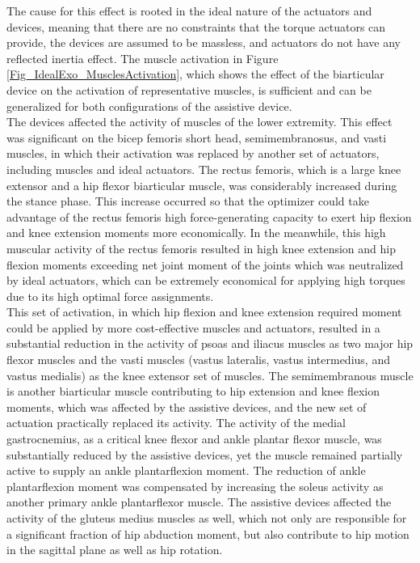 \documentclass[10pt,letterpaper]{article}
\begin{document}
The cause for this effect is rooted in the ideal nature of the actuators and devices, meaning that there are no constraints that the torque actuators can provide, the devices are assumed to be massless, and actuators do not have any reflected inertia effect. The muscle activation in Figure \ref{Fig_IdealExo_MusclesActivation}, which shows the effect of the biarticular device on the activation of representative muscles, is sufficient and can be generalized for both configurations of the assistive device. \\
The devices affected the activity of muscles of the lower extremity. This effect was significant on the bicep femoris short head, semimembranosus, and vasti muscles, in which their activation was replaced by another set of actuators, including muscles and ideal actuators.  The rectus femoris, which is a large knee extensor and a hip flexor biarticular muscle, was considerably increased during the stance phase. This increase occurred so that the optimizer could take advantage of the rectus femoris high force-generating capacity to exert hip flexion and knee extension moments more economically. In the meanwhile, this high muscular activity of the rectus femoris resulted in high knee extension and hip flexion moments exceeding net joint moment of the joints which was neutralized by ideal actuators, which can be extremely economical for applying high torques due to its high optimal force assignments.\\
This set of activation, in which hip flexion and knee extension required moment could be applied by more cost-effective muscles and actuators, resulted in a substantial reduction in the activity of psoas and iliacus muscles as two major hip flexor muscles and the vasti muscles (vastus lateralis, vastus intermedius, and vastus medialis) as the knee extensor set of muscles. The semimembranous muscle is another biarticular muscle contributing to hip extension and knee flexion moments, which was affected by the assistive devices, and the new set of actuation practically replaced its activity. The activity of the medial gastrocnemius, as a critical knee flexor and ankle plantar flexor muscle, was substantially reduced by the assistive devices, yet the muscle remained partially active to supply an ankle plantarflexion moment. The reduction of ankle plantarflexion moment was compensated by increasing the soleus activity as another primary ankle plantarflexor muscle. The assistive devices affected the activity of the gluteus medius muscles as well, which not only are responsible for a significant fraction of hip abduction moment, but also contribute to hip motion in the sagittal plane as well as hip rotation.\\
\end{document}
